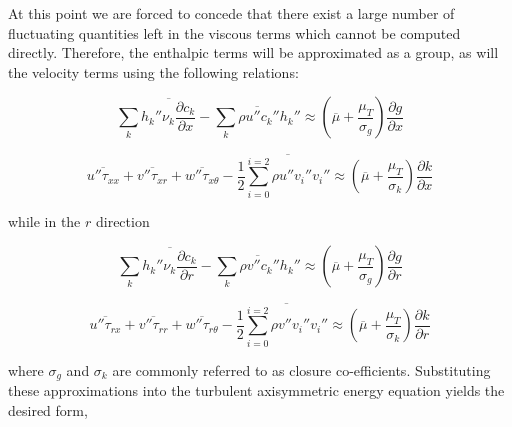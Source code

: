 	At this point we are forced to concede that there exist a large number of fluctuating quantities
left in the viscous terms which cannot be computed directly.  Therefore, the enthalpic terms will be 
approximated as a group, as will the velocity terms using the following relations:

\begin{equation}
	\sum_k \overline{h_k'' \nu_k \frac{\partial c_k}{\partial x}} - \overline{\sum_k \rho u'' c_k'' h_k''} \approx
	(\overline{\mu} + \frac{\mu_T}{\sigma_g})\frac{\partial g}{\partial x}
\label{eqn:energyxend1}
\end{equation}

\begin{equation}
	\overline{u''\tau_{xx}} + \overline{v''\tau_{xr}} + \overline{w''\tau_{x\theta}} 
	-\frac{1}{2}\overline{\sum_{i=0}^{i=2} \rho u'' v_i'' v_i''} \approx
	(\overline{\mu} + \frac{\mu_T}{\sigma_k})\frac{\partial k}{\partial x}
\label{eqn:energyxend2}
\end{equation}

	while in the $r$ direction

\begin{equation}
	\sum_k \overline{h_k'' \nu_k \frac{\partial c_k}{\partial r}} - \overline{\sum_k \rho v'' c_k'' h_k''} \approx
	(\overline{\mu} + \frac{\mu_T}{\sigma_g})\frac{\partial g}{\partial r}
\label{eqn:energyrend1}
\end{equation}

\begin{equation}
	\overline{u''\tau_{rx}} + \overline{v''\tau_{rr}} + \overline{w''\tau_{r\theta}} 
	-\frac{1}{2}\overline{\sum_{i=0}^{i=2} \rho v'' v_i'' v_i''} \approx
	(\overline{\mu} + \frac{\mu_T}{\sigma_k})\frac{\partial k}{\partial r}
\label{eqn:energyrend2}
\end{equation}

	where $\sigma_g$ and $\sigma_k$ are commonly referred to as closure co-efficients.  Substituting these approximations 
into the turbulent axisymmetric energy equation yields the desired form,

